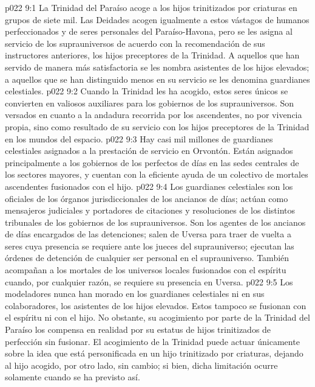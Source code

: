\vs p022 9:1 La Trinidad del Paraíso acoge a los hijos trinitizados por criaturas en grupos de siete mil. Las Deidades acogen igualmente a estos vástagos de humanos perfeccionados y de seres personales del Paraíso\hyp{}Havona, pero se les asigna al servicio de los suprauniversos de acuerdo con la recomendación de sus instructores anteriores, los hijos preceptores de la Trinidad. A aquellos que han servido de manera más satisfactoria se les nombra asistentes de los hijos elevados; a aquellos que se han distinguido menos en su servicio se les denomina guardianes celestiales.
\vs p022 9:2 Cuando la Trinidad les ha acogido, estos seres únicos se convierten en valiosos auxiliares para los gobiernos de los suprauniversos. Son versados en cuanto a la andadura recorrida por los ascendentes, no por vivencia propia, sino como resultado de su servicio con los hijos preceptores de la Trinidad en los mundos del espacio.
\vs p022 9:3 \pc Hay casi mil millones de guardianes celestiales asignados a la prestación de servicio en Orvontón. Están asignados principalmente a los gobiernos de los perfectos de días en las sedes centrales de los sectores mayores, y cuentan con la eficiente ayuda de un colectivo de mortales ascendentes fusionados con el hijo.
\vs p022 9:4 Los guardianes celestiales son los oficiales de los órganos jurisdiccionales de los ancianos de días; actúan como mensajeros judiciales y portadores de citaciones y resoluciones de los distintos tribunales de los gobiernos de los suprauniversos. Son los agentes de los ancianos de días encargados de las detenciones; salen de Uversa para traer de vuelta a seres cuya presencia se requiere ante los jueces del suprauniverso; ejecutan las órdenes de detención de cualquier ser personal en el suprauniverso. También acompañan a los mortales de los universos locales fusionados con el espíritu cuando, por cualquier razón, se requiere su presencia en Uversa.
\vs p022 9:5 \pc Los modeladores nunca han morado en los guardianes celestiales ni en sus colaboradores, los asistentes de los hijos elevados. Estos tampoco se fusionan con el espíritu ni con el hijo. No obstante, su acogimiento por parte de la Trinidad del Paraíso los compensa en realidad por su estatus de hijos trinitizados de perfección sin fusionar. El acogimiento de la Trinidad puede actuar únicamente sobre la idea que está personificada en un hijo trinitizado por criaturas, dejando al hijo acogido, por otro lado, sin cambio; si bien, dicha limitación ocurre solamente cuando se ha previsto así.
